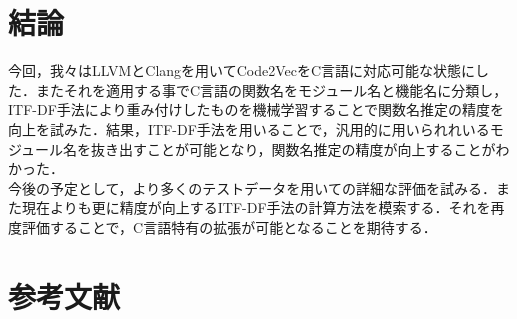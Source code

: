 \documentclass[submit,techrep,noauthor]{ipsj}
\begin{document}
\section{結論}
今回，我々はLLVMとClangを用いてCode2VecをC言語に対応可能な状態にした．またそれを適用する事でC言語の関数名をモジュール名と機能名に分類し，ITF-DF手法により重み付けしたものを機械学習することで関数名推定の精度を向上を試みた．結果，ITF-DF手法を用いることで，汎用的に用いられれいるモジュール名を抜き出すことが可能となり，関数名推定の精度が向上することがわかった．\\
今後の予定として，より多くのテストデータを用いての詳細な評価を試みる．また現在よりも更に精度が向上するITF-DF手法の計算方法を模索する．それを再度評価することで，C言語特有の拡張が可能となることを期待する．



\section{参考文献}



% 
% 











\end{document}
